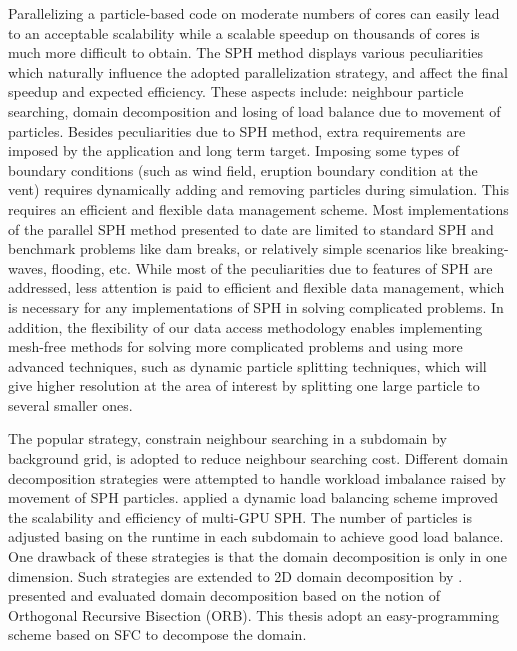 Parallelizing a particle-based code on moderate numbers of cores can easily lead to an acceptable scalability while a scalable speedup on thousands of cores is much more difficult to obtain. The SPH method displays various peculiarities which naturally influence the adopted parallelization strategy, and affect the final speedup and expected efficiency. These aspects include: neighbour particle searching, domain decomposition and losing of load balance due to movement of particles. Besides peculiarities due to SPH method, extra requirements are imposed by the application and long term target. Imposing some types of boundary conditions (such as wind field, eruption boundary condition at the vent) requires dynamically adding and removing particles during simulation. This requires an efficient and flexible data management scheme. Most implementations of the parallel SPH method presented to date are limited to standard SPH and benchmark problems like dam breaks, or relatively simple scenarios like breaking-waves, flooding, etc. While most of the peculiarities due to features of SPH are addressed, less attention is paid to efficient and flexible data management, which is necessary for any implementations of SPH in solving complicated problems. In addition, the flexibility of our data access methodology enables implementing mesh-free methods for solving more complicated problems and using more advanced techniques, such as dynamic particle splitting techniques\cite{vacondio2012accurate, feldman2007dynamic}, which will give higher resolution at the area of interest by splitting one large particle to several smaller ones.

The popular strategy, constrain neighbour searching in a subdomain by background grid, is adopted to reduce neighbour searching cost. Different domain decomposition strategies were attempted to handle workload imbalance raised by movement of SPH particles. \citet{dominguez2013new} applied a dynamic load balancing scheme improved the scalability and efficiency of multi-GPU SPH. The number of particles is adjusted basing on the runtime in each subdomain to achieve good load balance. One drawback of these strategies is that the domain decomposition is only in one dimension. Such strategies are extended to 2D domain decomposition by \citet{rustico2014advances}. \citet{oger2016distributed} presented and evaluated domain decomposition based on the notion of Orthogonal Recursive Bisection (ORB). This thesis adopt an easy-programming scheme based on SFC \cite{patra1999efficient} to decompose the domain.

